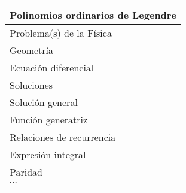 \renewcommand\arraystretch{2}
\begin{table}[H]
    \centering
\begin{tabular}{| p{5cm} | p{10cm} |} \hline
\multicolumn{2}{|c|}{\textbf{Polinomios ordinarios de Legendre}} \\ \hline
Problema(s) de la Física & \\ \hline
Geometría & \\ \hline
Ecuación diferencial & \\ \hline
Soluciones & \\ \hline
Solución general & \\ \hline
Función generatriz & \\ \hline
Relaciones de recurrencia & \\ \hline
Expresión integral & \\ \hline
Paridad & \\ \hline
$\cdots$ & \\ \hline
\end{tabular}
\end{table}

